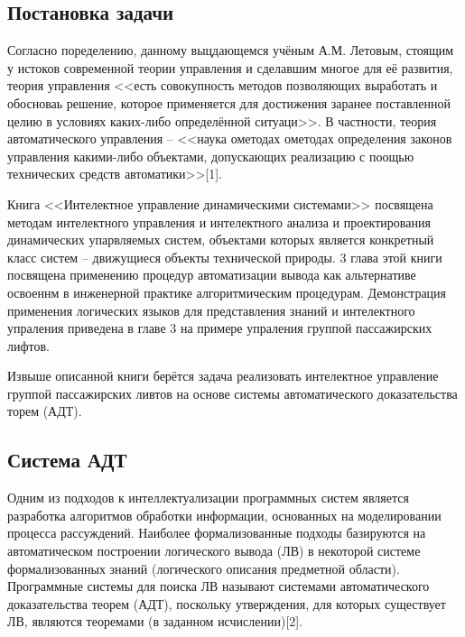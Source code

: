 
\usepackage{hyperref,xcolor}




\setcounter{page}{2}

\subsection*{Постановка задачи}

Согласно  поределению, данному выцдающемся учёным А.М. Летовым, стоящим у истоков современной теории управления и сделавшим многое для её развития, теория управления <<есть совокупность методов позволяющих выработать и обосноваь решение, которое применяется для достижения заранее поставленной целию в условиях каких-либо определённой ситуаци>>. В частности, теория автоматического управления -- <<наука ометодах ометодах определения законов управления какими-либо объектами, допускающих реализацию с поощью технических средств автоматики>>[1].

    Книга <<Интелектное управление динамическими системами>> посвящена методам интелектного управления и интелектного анализа и проектирования динамических упарвляемых систем, объектами которых является конкретный класс систем -- движущиеся объекты технической природы. 3 глава этой книги посвящена применению процедур автоматизации вывода как альтернативе освоеннм в инженерной практике алгоритмическим процедурам. Демонстрация применения логических языков для представления знаний и интелектного упраления приведена в главе 3 на примере упраления группой пассажирских лифтов. 

    Извыше описанной книги берётся задача реализовать интелектное управление группой пассажирских ливтов на основе системы автоматического доказательства торем (АДТ).

\subsection*{Система АДТ}

Одним из подходов к интеллектуализации программных систем является разработка алгоритмов обработки информации, основанных на моделировании процесса рассуждений. Наиболее формализованные подходы базируются на автоматическом построении логического вывода (ЛВ) в некоторой системе формализованных знаний (логического описания предметной области). Программные системы для поиска ЛВ называют системами автоматического доказательства теорем (АДТ), поскольку утверждения, для которых существует ЛВ, являются теоремами (в заданном исчислении)[2].

